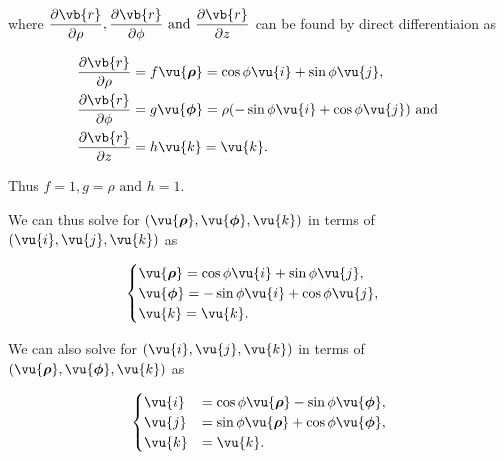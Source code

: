 \documentclass[english,a4paper,12pt]{report}
\begin{document}
where \(\displaystyle \frac{\partial \vb{r} }{\partial \rho }, \frac{\partial \vb{r} }{\partial \phi } \text { and } \frac{\partial \vb{r} }{\partial z} \) can be found by direct differentiaion as 

\begin{equation}
	\begin{aligned} 
		\frac{\partial \vb{r} }{\partial \rho }  &= f \vu{\boldsymbol{\rho } } = \cos{\phi}\vu{i} + \sin{\phi}\vu{j}, \\
		\frac{\partial \vb{r} }{\partial \phi }  &= g \vu{\boldsymbol{\phi } } = \rho (-\sin{\phi}\vu{i} + \cos{\phi}\vu{j}) \text { and }  \\
		\frac{\partial \vb{r} }{\partial z }  &= h \vu{k} = \vu{k}. 
	\end{aligned} 
\end{equation}

Thus \(f = 1, g = \rho  \text { and }  h = 1\). 

We can thus solve for \((\vu{\boldsymbol{\rho } }, \vu{\boldsymbol{\phi } }, \vu{k} )\) in terms of \((\vu{i} ,\vu{j} ,\vu{k} )\) as

\begin{equation}
    \begin{cases} 
        \vu{\boldsymbol{\rho } } = \cos \phi \vu{i} + \sin \phi \vu{j}, \\
        \vu{\boldsymbol{\phi } } = -\sin \phi \vu{i} + \cos \phi \vu{j}, \\
        \vu{k} = \vu{k}.
        \end{cases}
\end{equation}



We can also solve for \((\vu{i} , \vu{j}, \vu{k} )\) in terms of \((\vu{\boldsymbol{\rho } }, \vu{\boldsymbol{\phi } }, \vu{k} )\) as  

\begin{equation}
    \begin{cases}
        \vu{i} &= \cos \phi  \vu{\boldsymbol{\rho } } - \sin \phi \vu{\boldsymbol{\phi } }, \\
        \vu{j} &= \sin \phi \vu{\boldsymbol{\rho } } + \cos \phi \vu{\boldsymbol{\phi } }, \\
        \vu{k} &= \vu{k}. 
        \end{cases}
\end{equation}
\end{document}
